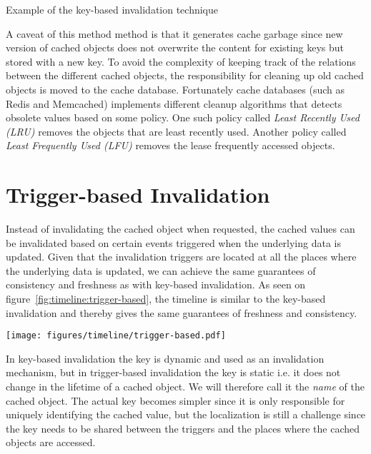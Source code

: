 \begin{code}{Example of the key-based invalidation technique}
  
  \label{code:key-based-invalidation}
\end{code}

A caveat of this method method is that it generates cache garbage since new version of cached objects does not overwrite the content for existing keys but stored with a new key. To avoid the complexity of keeping track of the relations between the different cached objects, the responsibility for cleaning up old cached objects is moved to the cache database. Fortunately cache databases (such as Redis and Memcached) implements different cleanup algorithms that detects obsolete values based on some policy. One such policy called \emph{Least Recently Used (LRU)} removes the objects that are least recently used. Another policy called \emph{Least Frequently Used (LFU)} removes the lease frequently accessed objects.


\section{Trigger-based Invalidation}
\label{subsec:trigger_based_invalidation}

Instead of invalidating the cached object when requested, the cached values can be invalidated based on certain events triggered when the underlying data is updated. Given that the invalidation triggers are located at all the places where the underlying data is updated, we can achieve the same guarantees of consistency and freshness as with key-based invalidation. As seen on figure~\ref{fig:timeline:trigger-based}, the timeline is similar to the key-based invalidation and thereby gives the same guarantees of freshness and consistency.

\begin{figure*}[ht!]
  \centering
  \texttt{[image: figures/timeline/trigger-based.pdf]}
  \caption{The lifecycle of the trigger-based invalidation technique}
  \label{fig:timeline:trigger-based}
\end{figure*}

In key-based invalidation the key is dynamic and used as an invalidation mechanism, but in trigger-based invalidation the key is static i.e. it does not change in the lifetime of a cached object. We will therefore call it the \emph{name} of the cached object. The actual key becomes simpler since it is only responsible for uniquely identifying the cached value, but the localization is still a challenge since the key needs to be shared between the triggers and the places where the cached objects are accessed.

